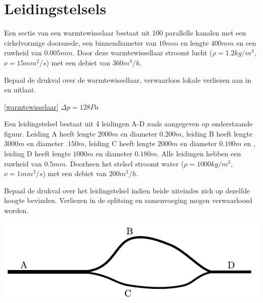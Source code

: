 \chapter{Leidingstelsels}
\label{sec:Leidingstelsels}
\begin{toepassing}[*]
	\label{warmtewisselaar}
Een sectie van een warmtewisselaar bestaat uit 100 parallelle kanalen met een cirkelvormige doorsnede, een binnendiameter van $10 \unit{mm}$ en lengte $400 \unit{mm}$ en een ruwheid van $0.005 \unit{mm}$. Door deze warmtewissellaar stroomt lucht ($\rho=1.2 \unit{kg/m^3}$, $\nu=15 \unit{mm^2/s}$) met een debiet van $360 \unit{m^3/h}$.
		
Bepaal de drukval over de warmtewissellaar, verwaarloos lokale verliezen aan in en uitlaat.	
\end{toepassing}
\begin{antwoord}{\ref{warmtewisselaar}}
	$\Delta p = 128 \unit{Pa}$
\end{antwoord}
\begin{toepassing}[*]
	\label{serie parallel}
Een leidingstelsel bestaat uit 4 leidingen A-D zoals aangegeven op onderstaande figuur. Leiding A heeft lengte $2000 \unit{m}$ en diameter $0.200 \unit{m}$, leiding B heeft lengte $3000 \unit{m}$ en diameter $.150 \unit{m}$, leiding C heeft lengte $2000 \unit{m}$ en diameter $0.100 \unit{m}$ en , leiding D heeft lengte $1000 \unit{m}$ en diameter $0.180 \unit{m}$. Alle leidingen hebben een ruwheid van $0.5 \unit{mm}$. Doorheen het stelsel stroomt water ($\rho=1000 \unit{kg/m^3}$, $\nu=1 \unit{mm^2/s}$) met een debiet van $200 \unit{m^3/h}$.

Bepaal de drukval over het leidingstelsel indien beide uiteindes zich op dezelfde hoogte bevinden. Verliezen in de splitsing en samenvoeging mogen verwaarloosd worden.

	\centering
	\includegraphics{fig/leidingstelsels/serie_parallel}
\end{toepassing}
